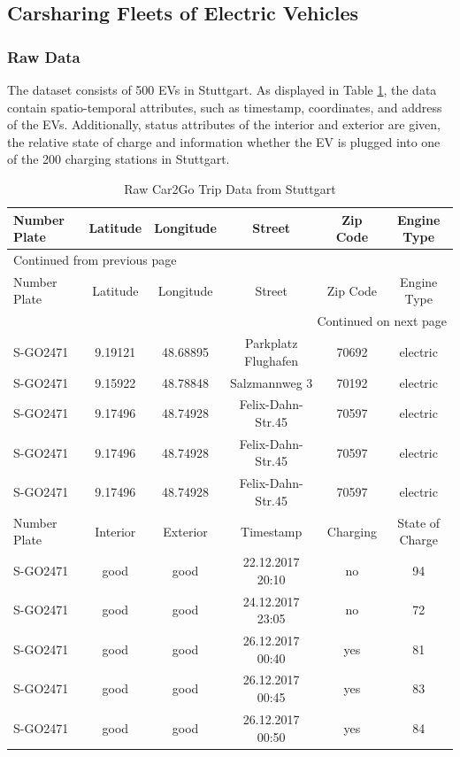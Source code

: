 \documentclass[a4paper, twoside, 12pt]{article}
\begin{document}
\subsection{Carsharing Fleets of Electric Vehicles}
\label{sec:org0cb9189}
\subsubsection{Raw Data}
\label{sec:orgcf26099}
The dataset consists of 500 EVs in Stuttgart. As displayed in Table
\ref{car2go-sample-data}, the data contain spatio-temporal attributes, such as
timestamp, coordinates, and address of the EVs. Additionally, status attributes
of the interior and exterior are given, the relative state of charge and
information whether the EV is plugged into one of the 200 charging stations in
Stuttgart.

\begin{longtable}{l|ccccc}
\caption{Raw Car2Go Trip Data from Stuttgart \label{car2go-sample-data}}
\\
\hline
\hline
Number Plate & Latitude & Longitude & Street & Zip Code & Engine Type\\
\hline
\endfirsthead
\multicolumn{6}{l}{Continued from previous page} \\
\hline

Number Plate & Latitude & Longitude & Street & Zip Code & Engine Type \\

\hline
\endhead
\hline\multicolumn{6}{r}{Continued on next page} \\
\endfoot
\endlastfoot
\hline
S-GO2471 & 9.19121 & 48.68895 & Parkplatz Flughafen & 70692 & electric\\
S-GO2471 & 9.15922 & 48.78848 & Salzmannweg 3 & 70192 & electric\\
S-GO2471 & 9.17496 & 48.74928 & Felix-Dahn-Str.45 & 70597 & electric\\
S-GO2471 & 9.17496 & 48.74928 & Felix-Dahn-Str.45 & 70597 & electric\\
S-GO2471 & 9.17496 & 48.74928 & Felix-Dahn-Str.45 & 70597 & electric\\
\hline
Number Plate & Interior & Exterior & Timestamp & Charging & State of Charge\\
\hline
S-GO2471 & good & good & 22.12.2017 20:10 & no & 94\\
S-GO2471 & good & good & 24.12.2017 23:05 & no & 72\\
S-GO2471 & good & good & 26.12.2017 00:40 & yes & 81\\
S-GO2471 & good & good & 26.12.2017 00:45 & yes & 83\\
S-GO2471 & good & good & 26.12.2017 00:50 & yes & 84\\
\hline
\hline
\end{longtable}
\end{document}
